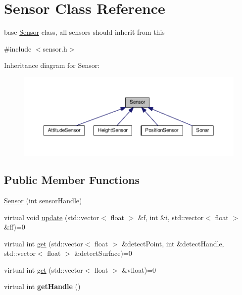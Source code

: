 \hypertarget{classSensor}{}\section{Sensor Class Reference}
\label{classSensor}


base \hyperlink{classSensor}{Sensor} class, all sensors should inherit from this  




{\ttfamily \#include $<$sensor.\+h$>$}



Inheritance diagram for Sensor\+:\nopagebreak
\begin{figure}[H]
\begin{center}
\leavevmode
\includegraphics[width=350pt]{classSensor__inherit__graph}
\end{center}
\end{figure}
\subsection*{Public Member Functions}
\begin{DoxyCompactItemize}
\item 
\hyperlink{classSensor_aec15220e0b38da37e43b0525ac689499}{Sensor} (int sensor\+Handle)
\item 
virtual void \hyperlink{classSensor_abb6c93c88529bc392d129443b3d352f3}{update} (std\+::vector$<$ float $>$ \&f, int \&i, std\+::vector$<$ float $>$ \&ff)=0
\item 
virtual int \hyperlink{classSensor_a997a8679d48c4fa346e6ac43c1e6219a}{get} (std\+::vector$<$ float $>$ \&detect\+Point, int \&detect\+Handle, std\+::vector$<$ float $>$ \&detect\+Surface)=0
\item 
virtual int \hyperlink{classSensor_a24f11619b11d5effc4066546629179ae}{get} (std\+::vector$<$ float $>$ \&vfloat)=0
\item 
virtual int {\bfseries get\+Handle} ()\hypertarget{classSensor_ac647e98897da5ffcc9711ba27ec45abd}{}\label{classSensor_ac647e98897da5ffcc9711ba27ec45abd}

\end{DoxyCompactItemize}
